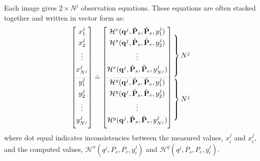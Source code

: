 Each image gives $2\times N^j$ observation equations. These equations are often stacked together and written in vector form as:
\begin{equation} \label{eq:Ffunction}
\begin{bmatrix}
 x^j_1\\[0.3em]
 x^j_2\\[0.3em]
 \vdots\\[0.3em]
 x^j_{N^j}\\[0.5em]
 \arrayrulecolor{lightgray} \hline
 y^j_1\\[0.3em]
 y^j_2\\[0.3em]
 \vdots\\[0.3em]
 y^j_{N^j}\\[0.5em]
\end{bmatrix}
\doteq
\begin{bmatrix}
 \mathcal{H}^x(\mathbf{q}^j,\hat{\mathbf{P}}_s,\hat{\mathbf{P}}_e,y^j_{1})\\[0.3em]
 \mathcal{H}^x(\mathbf{q}^j,\hat{\mathbf{P}}_s,\hat{\mathbf{P}}_e,y^j_{2})\\[0.3em]
 \vdots\\[0.3em]
 \mathcal{H}^x(\mathbf{q}^j,\hat{\mathbf{P}}_s,\hat{\mathbf{P}}_e,y^j_{N^j})\\[0.5em]
 \arrayrulecolor{lightgray} \hline
 \mathcal{H}^y(\mathbf{q}^j,\hat{\mathbf{P}}_s,\hat{\mathbf{P}}_e,y^j_{1})\\[0.3em]
 \mathcal{H}^y(\mathbf{q}^j,\hat{\mathbf{P}}_s,\hat{\mathbf{P}}_e,y^j_{2})\\[0.3em]
 \vdots\\[0.3em]
 \mathcal{H}^y(\mathbf{q}^j,\hat{\mathbf{P}}_s,\hat{\mathbf{P}}_e,y^j_{N^j})\\[0.5em]
\end{bmatrix}
\begin{array}{@{\kern-\nulldelimiterspace}l@{}}
 \left.\begin{array}{@{}c@{}}\\[0.3em] \\[0.3em] \\[0.3em] \\[0.5em] \end{array}\right\} N^j\\
 \left.\begin{array}{@{}c@{}}\\[0.3em] \\[0.3em] \\[0.3em] \\[0.5em] \end{array}\right\} N^j\\
\end{array}
\end{equation}
where dot equal indicates inconsistencies between the measured values, $x^j_i$ and $x^j_i$, and the computed values, $\mathcal{H}^x(q^j,P_s,P_e,y^j_i)$ and $\mathcal{H}^y(q^j,P_s,P_e,y^j_i)$.

